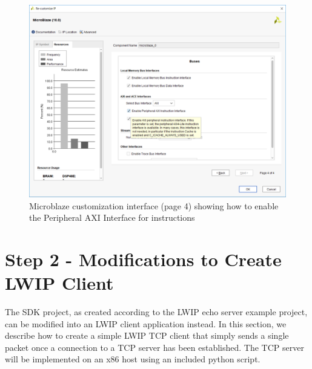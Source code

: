 \documentclass[11pt]{article}
\begin{document}
\begin{figure}[t]
\centering
\includegraphics[width=\textwidth]{mb_cust4.png}
\caption{Microblaze customization interface (page 4) showing how to enable the Peripheral AXI Interface for instructions}
\label{fig:mb_cust4}
\end{figure}

\section*{Step 2 - Modifications to Create LWIP Client}
The SDK project, as created according to the LWIP echo server example project, can be modified into an LWIP client application instead. In this section, we describe how to create a simple LWIP TCP client that simply sends a single packet once a connection to a TCP server has been established. The TCP server will be implemented on an x86 host using an included python script.
\end{document}
